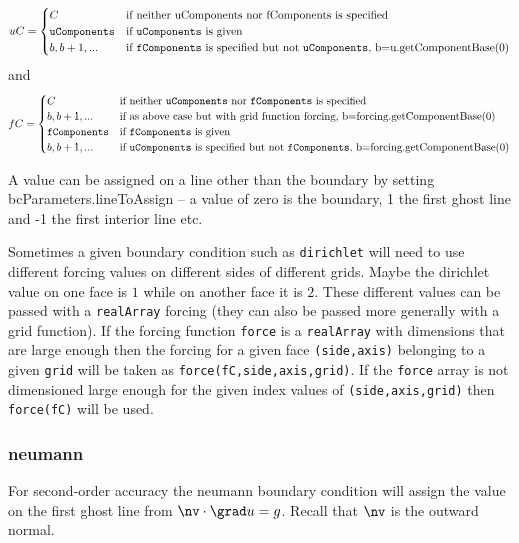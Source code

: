 \[
 uC = \begin{cases}
           C & \text{if neither uComponents nor fComponents is specified} \\
           {\tt uComponents} &  \text{if {\tt uComponents} is given } \\
    b,b+1,... & \text{if {\tt fComponents} is specified but not {\tt uComponents}, b=u.getComponentBase(0)}
      \end{cases}
\]
and
\[
 fC = \begin{cases}
           C & \text{if neither {\tt uComponents} nor {\tt fComponents} is specified} \\
           b,b+1,... & \text{if as above case but with grid function forcing, b=forcing.getComponentBase(0)} \\
           {\tt fComponents} &  \text{if {\tt fComponents} is given } \\
    b,b+1,... & \text{if {\tt uComponents} is specified but not {\tt fComponents}, b=forcing.getComponentBase(0)}
      \end{cases}
\]

A value can be assigned on a line other than the boundary by setting
{\ff bcParameters.lineToAssign} -- a value of zero is the boundary, 1 the first
ghost line and -1 the first interior line etc.

Sometimes a given boundary condition such as {\tt dirichlet} will need to use different
forcing values on different sides of different grids. Maybe the dirichlet value
on one face is $1$ while on another face it is $2$. These different values
can be passed with a {\tt realArray} forcing (they can also be passed more generally with 
a grid function).
If the forcing function {\tt force} is a {\tt realArray} with dimensions that are large enough
then the forcing for a given face {\tt (side,axis)} belonging to a given {\tt grid} will
be taken as {\tt force(fC,side,axis,grid)}. If the {\tt force} array is not dimensioned large
enough for the given index values of {\tt (side,axis,grid)} then {\tt force(fC)} will
be used.

\subsubsection{neumann}

For second-order accuracy the neumann boundary condition will assign the value
on the first ghost line from $\nv\cdot\grad u = g$. Recall that $\nv$ is the
outward normal.

